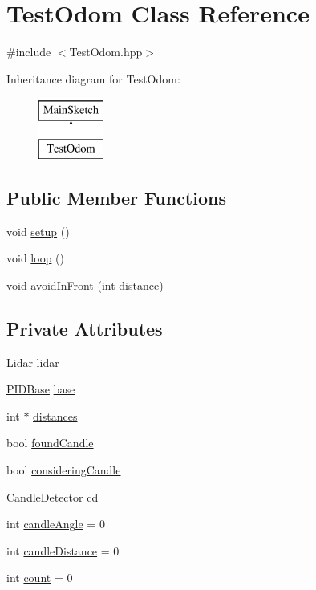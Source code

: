 \hypertarget{classTestOdom}{\section{Test\-Odom Class Reference}
\label{classTestOdom}
}


{\ttfamily \#include $<$Test\-Odom.\-hpp$>$}

Inheritance diagram for Test\-Odom\-:\begin{figure}[H]
\begin{center}
\leavevmode
\includegraphics[height=2.000000cm]{classTestOdom}
\end{center}
\end{figure}
\subsection*{Public Member Functions}
\begin{DoxyCompactItemize}
\item 
void \hyperlink{classTestOdom_ac468b764eecd5e27f3d1eb7667810230}{setup} ()
\item 
void \hyperlink{classTestOdom_aa920dd334ddf70f766499f798ca57a8b}{loop} ()
\item 
void \hyperlink{classTestOdom_a27f879657a8c2304e41d5495cf60b809}{avoid\-In\-Front} (int distance)
\end{DoxyCompactItemize}
\subsection*{Private Attributes}
\begin{DoxyCompactItemize}
\item 
\hyperlink{classLidar}{Lidar} \hyperlink{classTestOdom_a4b17e0e5d2294c284a6bc4c3a496b9dd}{lidar}
\item 
\hyperlink{classPIDBase}{P\-I\-D\-Base} \hyperlink{classTestOdom_a185b4bf8f3906701729e77109a22538a}{base}
\item 
int $\ast$ \hyperlink{classTestOdom_a235ba0e8870aec23452d6030efaf8c7e}{distances}
\item 
bool \hyperlink{classTestOdom_ac289c026423da6aec36952f02bc39b4f}{found\-Candle}
\item 
bool \hyperlink{classTestOdom_aacd35fc57d03d28c22cda5c414ae72fb}{considering\-Candle}
\item 
\hyperlink{classCandleDetector}{Candle\-Detector} \hyperlink{classTestOdom_a4ea35bef135d6bf40b9377ae6c38f1d9}{cd}
\item 
int \hyperlink{classTestOdom_a5645cf7c9e70140e5b7b96d3168e8006}{candle\-Angle} = 0
\item 
int \hyperlink{classTestOdom_a64c15d32fcf64aa273cc19f210accd35}{candle\-Distance} = 0
\item 
int \hyperlink{classTestOdom_a336a8f23ac4a1dcc780448bc7ef7f88b}{count} = 0
\end{DoxyCompactItemize}


